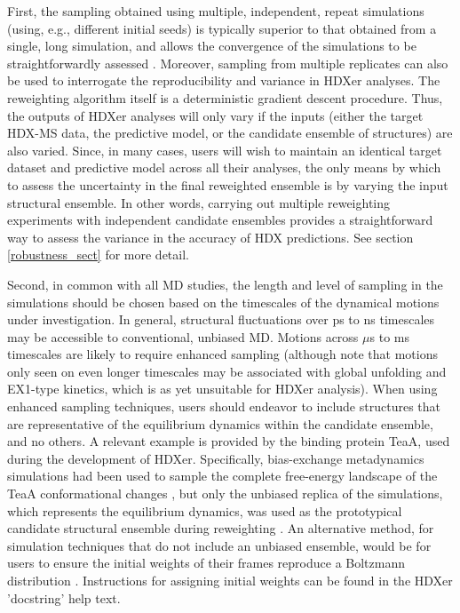 \documentclass[9pt,tutorial]{livecoms}
\begin{document}
First, the sampling obtained using multiple, independent, repeat simulations (using, e.g., different initial seeds) is typically superior to that obtained from a single, long simulation, and allows the convergence of the simulations to be straightforwardly assessed \cite{Hess2002,Faraldo-Gomez2004,Grossfield2019}.
Moreover, sampling from multiple replicates can also be used to interrogate the reproducibility and variance in HDXer analyses.
The reweighting algorithm itself is a deterministic gradient descent procedure.
Thus, the outputs of HDXer analyses will only vary if the inputs (either the target HDX-MS data, the predictive model, or the candidate ensemble of structures) are also varied.
Since, in many cases, users will wish to maintain an identical target dataset and predictive model across all their analyses, the only means by which to assess the uncertainty in the final reweighted ensemble is by varying the input structural ensemble.
In other words, carrying out multiple reweighting experiments with independent candidate ensembles provides a straightforward way to assess the variance in the accuracy of HDX predictions. 
See section \ref{robustness_sect} for more detail.

Second, in common with all MD studies, the length and level of sampling in the simulations should be chosen based on the timescales of the dynamical motions under investigation. 
In general, structural fluctuations over ps to ns timescales may be accessible to conventional, unbiased MD. 
Motions across $\mu$s to ms timescales are likely to require enhanced sampling \cite{Allison2020} (although note that motions only seen on even longer timescales may be associated with global unfolding and EX1-type kinetics, which is as yet unsuitable for HDXer analysis). 
When using enhanced sampling techniques, users should endeavor to include structures that are representative of the equilibrium dynamics within the candidate ensemble, and no others. 
A relevant example is provided by the binding protein TeaA, used during the development of HDXer.
Specifically, bias-exchange metadynamics simulations had been used to sample the complete free-energy landscape of the TeaA conformational changes \cite{Marinelli2011}, but only the unbiased replica of the simulations, which represents the equilibrium dynamics, was used as the prototypical candidate structural ensemble during reweighting \cite{Bradshaw2020}.
An alternative method, for simulation techniques that do not include an unbiased ensemble, would be for users to ensure the initial weights of their frames reproduce a Boltzmann distribution \cite{Torrie1977, Marinelli2021}.
Instructions for assigning initial weights can be found in the HDXer 'docstring' help text.
\end{document}
